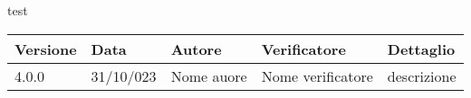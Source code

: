 \documentclass{article}
\begin{document}
    test
    \begin{tabular}{|C{2.5cm}|C{2.5cm}|C{2.5cm}|C{2.5cm}|C{2.5cm}|}
        \hline
        \textbf{Versione} & \textbf{Data} & \textbf{Autore} & \textbf{Verificatore} & \textbf{Dettaglio} \\
        \hline \hline
        \label{Git_Action_Version} 4.0.0 & 31/10/023 & Nome auore & Nome verificatore & descrizione \\
        \hline
    
    \end{tabular}
\end{document}
